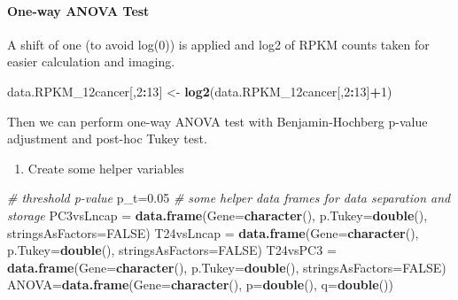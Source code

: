 \documentclass[]{article}
\newenvironment{Shaded}{\begin{snugshade}}{\end{snugshade}}
\newcommand{\KeywordTok}[1]{\textcolor[rgb]{0.13,0.29,0.53}{\textbf{#1}}}
\newcommand{\DataTypeTok}[1]{\textcolor[rgb]{0.13,0.29,0.53}{#1}}
\newcommand{\DecValTok}[1]{\textcolor[rgb]{0.00,0.00,0.81}{#1}}
\newcommand{\FloatTok}[1]{\textcolor[rgb]{0.00,0.00,0.81}{#1}}
\newcommand{\StringTok}[1]{\textcolor[rgb]{0.31,0.60,0.02}{#1}}
\newcommand{\CommentTok}[1]{\textcolor[rgb]{0.56,0.35,0.01}{\textit{#1}}}
\newcommand{\OtherTok}[1]{\textcolor[rgb]{0.56,0.35,0.01}{#1}}
\newcommand{\OperatorTok}[1]{\textcolor[rgb]{0.81,0.36,0.00}{\textbf{#1}}}
\newcommand{\NormalTok}[1]{#1}
\providecommand{\tightlist}{%
  \setlength{\itemsep}{0pt}\setlength{\parskip}{0pt}}
\let\oldparagraph\paragraph
\renewcommand{\paragraph}[1]{\oldparagraph{#1}\mbox{}}
\begin{document}
\paragraph{One-way ANOVA Test}\label{one-way-anova-test}

A shift of one (to avoid log(0)) is applied and log2 of RPKM counts
taken for easier calculation and imaging.

\begin{Shaded}
\begin{Highlighting}[]
\NormalTok{data.RPKM_12cancer[,}\DecValTok{2}\OperatorTok{:}\DecValTok{13}\NormalTok{] <-}\StringTok{ }\KeywordTok{log2}\NormalTok{(data.RPKM_12cancer[,}\DecValTok{2}\OperatorTok{:}\DecValTok{13}\NormalTok{]}\OperatorTok{+}\DecValTok{1}\NormalTok{)}
\end{Highlighting}
\end{Shaded}

Then we can perform one-way ANOVA test with Benjamin-Hochberg p-value
adjustment and post-hoc Tukey test.

\begin{enumerate}
\def\labelenumi{\arabic{enumi}.}
\tightlist
\item
  Create some helper variables
\end{enumerate}

\begin{Shaded}
\begin{Highlighting}[]
\CommentTok{# threshold p-value}
\NormalTok{p_t=}\FloatTok{0.05}
\CommentTok{# some helper data frames for data separation and storage}
\NormalTok{PC3vsLncap =}\StringTok{ }\KeywordTok{data.frame}\NormalTok{(}\DataTypeTok{Gene=}\KeywordTok{character}\NormalTok{(),  }\DataTypeTok{p.Tukey=}\KeywordTok{double}\NormalTok{(), }\DataTypeTok{stringsAsFactors=}\OtherTok{FALSE}\NormalTok{)}
\NormalTok{T24vsLncap =}\StringTok{ }\KeywordTok{data.frame}\NormalTok{(}\DataTypeTok{Gene=}\KeywordTok{character}\NormalTok{(),  }\DataTypeTok{p.Tukey=}\KeywordTok{double}\NormalTok{(), }\DataTypeTok{stringsAsFactors=}\OtherTok{FALSE}\NormalTok{)}
\NormalTok{T24vsPC3 =}\StringTok{ }\KeywordTok{data.frame}\NormalTok{(}\DataTypeTok{Gene=}\KeywordTok{character}\NormalTok{(),  }\DataTypeTok{p.Tukey=}\KeywordTok{double}\NormalTok{(), }\DataTypeTok{stringsAsFactors=}\OtherTok{FALSE}\NormalTok{)}
\NormalTok{ANOVA=}\KeywordTok{data.frame}\NormalTok{(}\DataTypeTok{Gene=}\KeywordTok{character}\NormalTok{(), }\DataTypeTok{p=}\KeywordTok{double}\NormalTok{(), }\DataTypeTok{q=}\KeywordTok{double}\NormalTok{())}
\end{Highlighting}
\end{Shaded}
\end{document}
